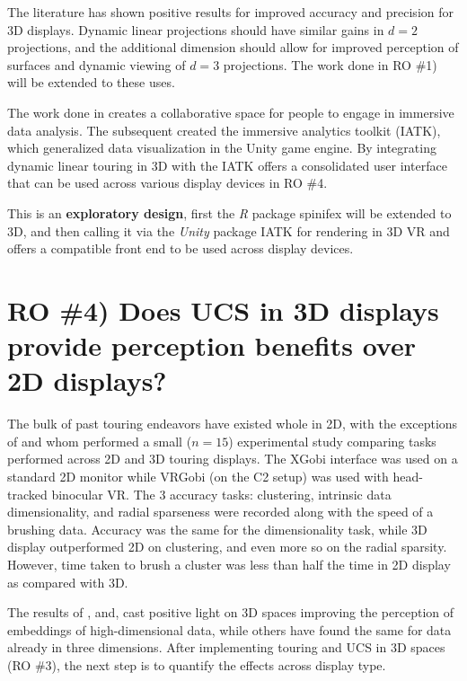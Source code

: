 \documentclass{monashthesis}
\begin{document}
The literature has shown positive results for improved accuracy and
precision for 3D displays. Dynamic linear projections should have
similar gains in \(d=2\) projections, and the additional dimension
should allow for improved perception of surfaces and dynamic viewing of
\(d=3\) projections. The work done in RO \#1) will be extended to these
uses.

The work done in \textcite{cordeil_imaxes:_2017} creates a collaborative
space for people to engage in immersive data analysis. The subsequent
\textcite{cordeil_immersive_2019} created the immersive analytics
toolkit (IATK), which generalized data visualization in the Unity game
engine. By integrating dynamic linear touring in 3D with the IATK offers
a consolidated user interface that can be used across various display
devices in RO \#4.

This is an \textbf{exploratory design}, first the \emph{R} package
spinifex will be extended to 3D, and then calling it via the
\emph{Unity} package IATK for rendering in 3D VR and offers a compatible
front end to be used across display devices.

\section{RO \#4) Does UCS in 3D displays provide perception benefits
over 2D displays?}\label{UCS_3dvs2d}

The bulk of past touring endeavors have existed whole in 2D, with the
exceptions of \textcite{nelson_xgobi_1998} and
\textcite{arms_benefits_1999} whom performed a small (\(n=15\))
experimental study comparing tasks performed across 2D and 3D touring
displays. The XGobi interface was used on a standard 2D monitor while
VRGobi (on the C2 setup) was used with head-tracked binocular VR. The 3
accuracy tasks: clustering, intrinsic data dimensionality, and radial
sparseness were recorded along with the speed of a brushing data.
Accuracy was the same for the dimensionality task, while 3D display
outperformed 2D on clustering, and even more so on the radial sparsity.
However, time taken to brush a cluster was less than half the time in 2D
display as compared with 3D.

The results of \textcite{wagner_filho_immersive_2018},
\textcite{nelson_xgobi_1998} and, \textcite{arms_benefits_1999} cast
positive light on 3D spaces improving the perception of embeddings of
high-dimensional data, while others have found the same for data already
in three dimensions. After implementing touring and UCS in 3D spaces (RO
\#3), the next step is to quantify the effects across display type.
\end{document}

